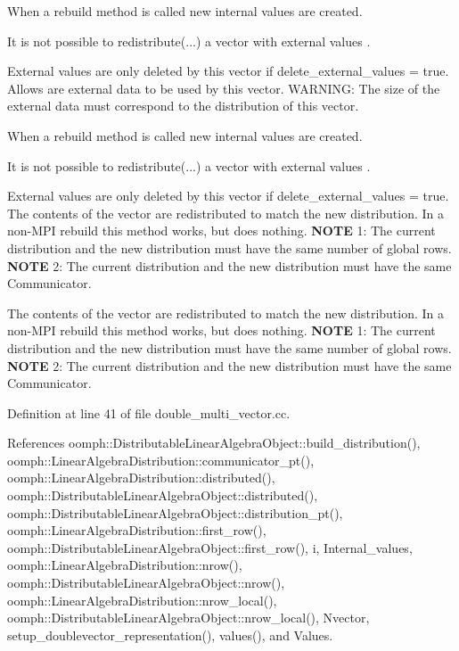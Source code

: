 \begin{DoxyEnumerate}
\item When a rebuild method is called new internal values are created.
\item It is not possible to redistribute(...) a vector with external values .
\item External values are only deleted by this vector if delete\+\_\+external\+\_\+values = true. Allows are external data to be used by this vector. W\+A\+R\+N\+I\+NG\+: The size of the external data must correspond to the distribution of this vector.
\end{DoxyEnumerate}
\begin{DoxyEnumerate}
\item When a rebuild method is called new internal values are created.
\item It is not possible to redistribute(...) a vector with external values .
\item External values are only deleted by this vector if delete\+\_\+external\+\_\+values = true. The contents of the vector are redistributed to match the new distribution. In a non-\/\+M\+PI rebuild this method works, but does nothing. {\bfseries N\+O\+TE} 1\+: The current distribution and the new distribution must have the same number of global rows. {\bfseries N\+O\+TE} 2\+: The current distribution and the new distribution must have the same Communicator.
\end{DoxyEnumerate}

The contents of the vector are redistributed to match the new distribution. In a non-\/\+M\+PI rebuild this method works, but does nothing. {\bfseries N\+O\+TE} 1\+: The current distribution and the new distribution must have the same number of global rows. {\bfseries N\+O\+TE} 2\+: The current distribution and the new distribution must have the same Communicator. 

Definition at line 41 of file double\+\_\+multi\+\_\+vector.\+cc.



References oomph\+::\+Distributable\+Linear\+Algebra\+Object\+::build\+\_\+distribution(), oomph\+::\+Linear\+Algebra\+Distribution\+::communicator\+\_\+pt(), oomph\+::\+Linear\+Algebra\+Distribution\+::distributed(), oomph\+::\+Distributable\+Linear\+Algebra\+Object\+::distributed(), oomph\+::\+Distributable\+Linear\+Algebra\+Object\+::distribution\+\_\+pt(), oomph\+::\+Linear\+Algebra\+Distribution\+::first\+\_\+row(), oomph\+::\+Distributable\+Linear\+Algebra\+Object\+::first\+\_\+row(), i, Internal\+\_\+values, oomph\+::\+Linear\+Algebra\+Distribution\+::nrow(), oomph\+::\+Distributable\+Linear\+Algebra\+Object\+::nrow(), oomph\+::\+Linear\+Algebra\+Distribution\+::nrow\+\_\+local(), oomph\+::\+Distributable\+Linear\+Algebra\+Object\+::nrow\+\_\+local(), Nvector, setup\+\_\+doublevector\+\_\+representation(), values(), and Values.



